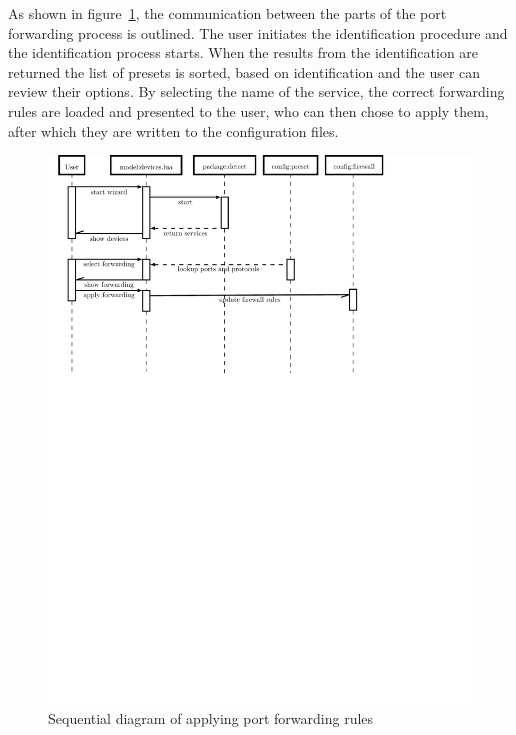 \documentclass[a4paper,11pt,makeidx]{kth-bcs}
\begin{document}
As shown in figure~\ref{fig:wizard-seq_dia}, the communication between the parts of the port forwarding process is outlined.
The user initiates the identification procedure and the identification process starts.
When the results from the identification are returned the list of presets is sorted, based on identification and the user can review their options.
By selecting the name of the service, the correct forwarding rules are loaded and presented to the user, who can then chose to apply them, after which they are written to the configuration files.
\begin{figure}[h!]
   \centering
   \includegraphics[trim = 0mm 190mm 30mm 0mm, clip, width=15cm]{wizard-seq_dia}
   \caption{Sequential diagram of applying port forwarding rules}
   \label{fig:wizard-seq_dia}
\end{figure}
\end{document}
